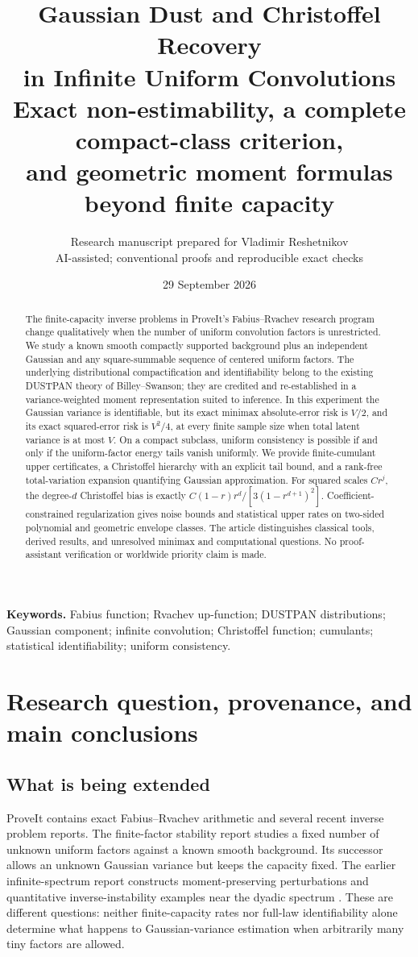 \documentclass[11pt,letterpaper]{article}
\title{\textbf{Gaussian Dust and Christoffel Recovery\\in Infinite Uniform Convolutions}\\[0.55em]\large Exact non-estimability, a complete compact-class criterion,\\and geometric moment formulas beyond finite capacity}
\author{Research manuscript prepared for Vladimir Reshetnikov\\\small AI-assisted; conventional proofs and reproducible exact checks}
\date{29 September 2026}
\numberwithin{equation}{section}
\theoremstyle{definition}
\theoremstyle{remark}
\begin{document}
\maketitle
\begin{abstract}
The finite-capacity inverse problems in ProveIt's Fabius--Rvachev research
program change qualitatively when the number of uniform convolution factors
is unrestricted. We study a known smooth compactly supported background plus
an independent Gaussian and any square-summable sequence of centered uniform
factors. The underlying distributional compactification and identifiability
belong to the existing DUSTPAN theory of Billey--Swanson; they are credited and
re-established in a variance-weighted moment representation suited to inference.
In this experiment the Gaussian variance is identifiable, but its exact
minimax absolute-error risk is $V/2$, and its exact squared-error risk is
$V^2/4$, at every finite sample size when total latent variance is at most $V$.
On a compact subclass, uniform consistency is possible if and only if the
uniform-factor energy tails vanish uniformly. We provide finite-cumulant
upper certificates, a Christoffel hierarchy with an explicit tail bound,
and a rank-free total-variation expansion quantifying Gaussian approximation.
For squared scales $Cr^j$, the degree-$d$ Christoffel bias is exactly
$C(1-r)r^d/[3(1-r^{d+1})^2]$. Coefficient-constrained regularization gives
noise bounds and statistical upper rates on two-sided polynomial and geometric
envelope classes. The article distinguishes classical tools, derived results,
and unresolved minimax and computational questions. No proof-assistant
verification or worldwide priority claim is made.
\end{abstract}
\vspace{0.4em}
\noindent\textbf{Keywords.} Fabius function; Rvachev up-function; DUSTPAN distributions;
Gaussian component; infinite convolution; Christoffel function; cumulants;
statistical identifiability; uniform consistency.
\clearpage
\tableofcontents
\newpage

\section{Research question, provenance, and main conclusions}
\label{sec:intro}

\subsection{What is being extended}
ProveIt contains exact Fabius--Rvachev arithmetic and several recent inverse
problem reports. The finite-factor stability report studies a fixed number of
unknown uniform factors against a known smooth background. Its successor
allows an unknown Gaussian variance but keeps the capacity fixed. The earlier
infinite-spectrum report constructs moment-preserving perturbations and
quantitative inverse-instability examples near the dyadic spectrum
\cite{repo,finite,gaussian,recovering}. These are different questions: neither
finite-capacity rates nor full-law identifiability alone determine what happens
to Gaussian-variance estimation when arbitrarily many tiny factors are allowed.
\end{document}
